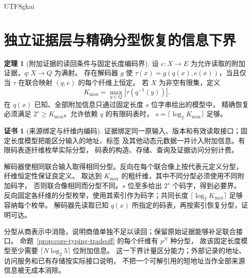 \documentclass[12pt]{report}
\makeatletter
\theoremstyle{definition}
\newtheorem{theorem}{定理}[chapter]
\newtheorem{Certificate}{证书}[chapter]
\renewenvironment{proof}[1][\proofname]{\par
  \pushQED{\qed}\normalfont
  \topsep6\p@\@plus6\p@\relax
  \trivlist
  \item[\hskip\labelsep\normalfont #1\@addpunct{.}]\ignorespaces
}{
  \popQED\endtrivlist\@endpefalse
}
\makeatother
\begin{document}
\begin{CJK*}{UTF8}{gkai}
\section{独立证据层与精确分型恢复的信息下界}
\begin{theorem}[附加证据的读回条件与固定长度编码界]
\label{thm:evidence-typing-cost}
设 \(e:X\to E\) 为允许读取的附加证据，\(q:X\to Q\) 为满射。
存在解码器 \(g\) 使 \(\tau(x)=g(q(x),e(x))\)，当且仅当
\(\tau\) 在联合映射 \((q,e)\) 的每个纤维上恒定。
若 \(X\) 为非空有限集，定义
\[
K_{\max}=\max_{y\in Q}|\tau(q^{-1}(y))|.
\]
在 \(q(x)\) 已知、全部附加信息只通过固定长度 \(s\) 位字串给出的模型中，
精确恢复必须满足 \(2^s\ge K_{\max}\)。允许依赖 \(q\) 的有限码表时，
\(s=\lceil\log_2K_{\max}\rceil\) 足够。
\end{theorem}
\begin{Certificate}[来源绑定与纤维内编码]
证据绑定同一原输入、版本和有效读取接口；固定长度模型把能区分输入的地址、标签
及其他动态元数据一并计入附加信息。有限码表逐纤维枚举实际分型，
码表的构造、存储、查询及证据访问分别计费。
\end{Certificate}
\begin{proof}
解码器使相同联合输入取得相同分型。反向在每个联合像上按代表元定义分型，
纤维恒定性保证良定义。
取达到 \(K_{\max}\) 的粗纤维，其中不同分型必须使用不同附加码字，
否则联合像相同而分型不同。\(s\) 位至多给出 \(2^s\) 个码字，得到必要界。
反向固定各纤维的分型枚举，使用其索引作为码字；共同长度
\(\lceil\log_2K_{\max}\rceil\) 足够容纳每个枚举。
解码器先读取已知 \(q(x)\) 所指定的码表，再按索引恢复分型，证明可达。
\end{proof}
分型从商表示中消隐，说明商值单独不足以读回；保留原始证据能够补足联合接口。
命题~\ref{prop:core-typing-tradeoff} 的每个纤维有 \(p^N\) 种分型，
故该固定长度模型至少需要 \(\lceil N\log_2 5\rceil\) 位附加信息。
这一下界计量区分能力；外部记录的地址、访问服务和已有存储按实际接口说明，
不把一个可解引用的短地址当作全部来源信息被无成本消除。


\end{CJK*}
\end{document}
